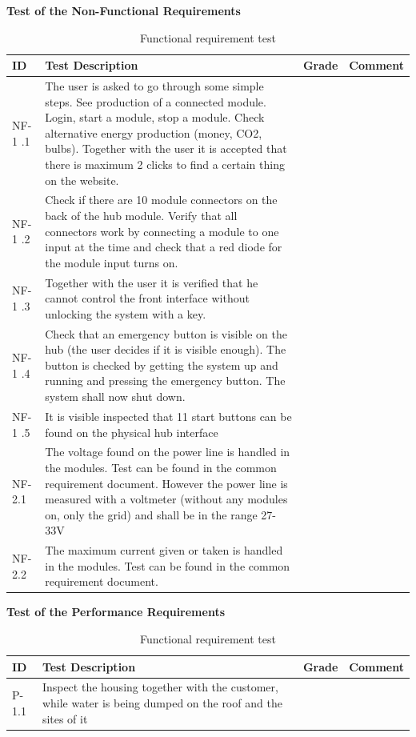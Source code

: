 \textbf{Test of the Non-Functional Requirements}
\begin{table}[H]
	\begin{tabular} [b] {| p{1.2cm} |  p{9.3cm} | p{1.2cm} | p{3.8cm} |}
	\hline
	\textbf{ID} & \textbf{Test Description} & \textbf{Grade} & \textbf{Comment} \\\hline
		NF-1	.1	& The user is asked to go through some simple steps. See production of a connected module. Login, start a module, stop a module. Check alternative energy production (money, CO2, bulbs).	Together with the user it is accepted that there is maximum 2 clicks to find a  certain thing on the website. &	&\\ \hline
		NF-1	.2	& Check if there are 10 module connectors on the back of the hub module. Verify that all connectors work by connecting a module to one input at the time and check that a red diode for the module input turns on. 	&	&\\ \hline
		NF-1	.3	& Together with the user it is verified that he cannot control the front interface without unlocking the system with a key. 	&	&\\ \hline
		NF-1	.4	& Check that an emergency button is visible on the hub (the user decides if it is visible enough). The button is checked by getting the system up and running and pressing the emergency button. The system shall now shut down.	&	&\\ \hline
		NF-1	.5	& It is visible inspected that 11 start buttons can be found on the physical hub interface	&	&\\ \hline
		NF-2.1	& The voltage found on the power line is handled in the modules. Test can be found in the common requirement document. However the power line is measured with a voltmeter (without any modules on, only the grid) and shall be in the range 27-33V	&	&\\ \hline
		NF-2.2	& The maximum current given or taken is handled in the modules. Test can be found in the common requirement document.	&	&\\ \hline
	\end{tabular}
	\caption{Functional requirement test}
\end{table}
\textbf{Test of the Performance Requirements}
\begin{table}[H]
	\begin{tabular} [b] {| p{1.2cm} |  p{9.3cm} | p{1.2cm} | p{3.8cm} |}
	\hline
	\textbf{ID} & \textbf{Test Description} & \textbf{Grade} & \textbf{Comment} \\\hline
		P-1.1	& Inspect the housing together with the customer, while water is being dumped on the roof and the sites of it &	&\\ \hline
	\end{tabular}
	\caption{Functional requirement test}
\end{table}
